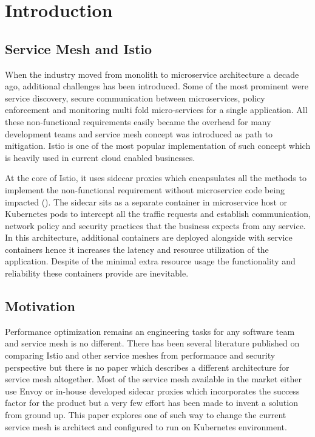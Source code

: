 \section{Introduction}
\subsection{Service Mesh and Istio}
When the industry moved from monolith to microservice architecture a decade ago, additional challenges has been introduced. Some of the most prominent were service discovery, secure communication between microservices, policy enforcement and monitoring multi fold micro-services for a single application. All these non-functional requirements easily became the overhead for many development teams and service mesh concept was introduced as path to mitigation. Istio is one of the most popular implementation of such concept which is heavily used in current cloud enabled businesses.

At the core of Istio, it uses sidecar proxies which encapsulates all the methods to implement the non-functional requirement without microservice code being impacted (\cite{techcrunch2022}). The sidecar sits as a separate container in microservice host or Kubernetes pods to intercept all the traffic requests and establish communication, network policy and security practices that the business expects from any service. In this architecture, additional containers are deployed alongside with service containers hence it increases the latency and resource utilization of the application. Despite of the minimal extra resource usage the functionality and reliability these containers provide are inevitable.

\subsection{Motivation}
Performance optimization remains an engineering tasks for any software team and service mesh is no different. There has been several literature published on comparing Istio and other service meshes from performance and security perspective but there is no paper which describes a different architecture for service mesh altogether. Most of the service mesh available in the market either use Envoy or in-house developed sidecar proxies which incorporates the success factor for the product but a very few effort has been made to invent a solution from ground up. This paper explores one of such way to change the current service mesh is architect and configured to run on Kubernetes environment.

